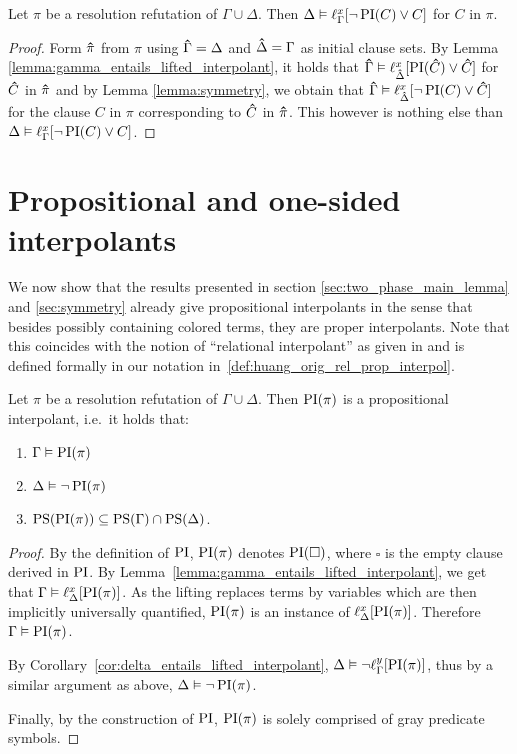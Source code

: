 \begin{corr}
	\label{cor:delta_entails_lifted_interpolant}
	Let $\pi$ be a resolution refutation of $\Gamma \cup \Delta$. 
	Then $\Delta \vDash \ell_{\Gamma}^{x}[ \lnot \operatorname{PI}(C) \lor C ]$ for $C$ in $\pi$.
\end{corr}
\begin{proof}
	Form $\bm\hat{\pi}$ from $\pi$ using $\bm\hat{\Gamma} = \Delta$ and $\bm\hat{\Delta} = \Gamma$ as initial clause sets.
	By Lemma \ref{lemma:gamma_entails_lifted_interpolant}, it holds that $\bm\hat{\Gamma} \vDash \ell_{\bm\hat{\Delta}}^{x}[ \operatorname{PI}(\bm\hat{C}) \lor \bm\hat{C} ]$ for $\bm\hat{C}$ in $\bm\hat{\pi}$ and 
	by Lemma \ref{lemma:symmetry}, we obtain that 
	$\bm\hat{\Gamma} \vDash \ell_{\bm\hat{\Delta}}^{x}[ \lnot \operatorname{PI}(C) \lor \bm\hat{C} ]$ for the clause $C$ in $\pi$ corresponding to $\bm\hat{C}$ in $\bm\hat{\pi}$. 
	This however is nothing else than 
	$\Delta \entails\nolinebreak \lft{\Gamma}{x}{ \lnot \PI(C) \lor C }$.
\end{proof}


\section{Propositional and one-sided interpolants}

We now show that the results presented in section \ref{sec:two_phase_main_lemma} and \ref{sec:symmetry}
already give propositional interpolants in the sense that besides possibly containing colored terms, they are proper interpolants.
Note that this coincides with the notion of ``relational interpolant'' as given in \cite{Huang95} and is defined formally in our notation in~\ref{def:huang_orig_rel_prop_interpol}.

\begin{corr}
	\label{cor:propositional_interpolant}
	Let $\pi$ be a resolution refutation of $\Gamma \cup \Delta$.
	Then $\operatorname{PI}(\pi)$ is a propositional interpolant, i.e.\ it holds that:
	\begin{enumerate}
		\item$\Gamma\vDash \operatorname{PI}(\pi)$
		\item$\Delta\vDash \lnot \operatorname{PI}(\pi)$
		\item $\operatorname{PS}(\operatorname{PI}(\pi)) \subseteq \operatorname{PS}(\Gamma) \cap \operatorname{PS}(\Delta)$.
	\end{enumerate}
\end{corr}
\begin{proof}
	By the definition of $\operatorname{PI}$, 
	$\operatorname{PI}(\pi)$ denotes $\operatorname{PI}(\square)$, where $\square$ is the empty clause derived in $\operatorname{PI}$.
	By Lemma~\ref{lemma:gamma_entails_lifted_interpolant}, we get that 
	$ \Gamma \vDash \ell_{\Delta}^{x}[\operatorname{PI}(\pi)]$.
	As the lifting replaces terms by variables which are then implicitly universally quantified, $\operatorname{PI}(\pi)$ is an instance of $\ell_{\Delta}^{x}[\operatorname{PI}(\pi)]$.
	Therefore $\Gamma \vDash \operatorname{PI}(\pi)$.

	By Corollary~\ref{cor:delta_entails_lifted_interpolant}, $\Delta \vDash \lnot \ell_{\Gamma}^{y}[\operatorname{PI}(\pi)]$,
	thus by a similar argument as above, $\Delta \vDash \lnot \operatorname{PI}(\pi)$.


	Finally, by the construction of $\operatorname{PI}$, $\operatorname{PI}(\pi)$ is solely comprised of gray predicate symbols.
\end{proof}


